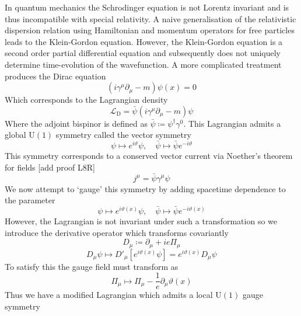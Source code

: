 \documentclass[11pt, a4paper]{article}
\theoremstyle{definition}
\theoremstyle{plain}
\begin{document}
In quantum mechanics the Schrodinger equation is not Lorentz invariant and is thus
incompatible with special relativity. A naive generalisation of the relativistic
dispersion relation using Hamiltonian and momentum operators
for free particles leads to the Klein-Gordon
equation. However, the Klein-Gordon equation is a second order partial differential equation and
subsequently does not uniquely determine time-evolution of the wavefunction.
A more complicated treatment produces the Dirac equation
\begin{equation}
  (i \gamma^\mu\partial_\mu - m)\psi(x) = 0
\end{equation}
Which corresponds to the Lagrangian density
\begin{equation}
  \mathcal{L}_\mathrm{D} = \bar{\psi}(i \gamma^\mu\partial_\mu - m)\psi
\end{equation}
Where the adjoint bispinor is defined as $\bar{\psi} \coloneq \psi^\dagger\gamma^0$.
This Lagrangian admits a global $\mathrm{U}(1)$ symmetry called the vector symmetry
\begin{equation}
  \psi \mapsto e^{i\vartheta}\psi, \quad \bar{\psi} \mapsto \bar{\psi}e^{-i\vartheta} 
\end{equation}
This symmetry corresponds to a conserved vector current via Noether's theorem for fields
[add proof L8R]
\begin{equation}
  j^\mu = \bar{\psi}\gamma^\mu\psi
\end{equation}
We now attempt to `gauge' this symmetry by adding spacetime dependence to the 
parameter
\begin{equation}
  \psi \mapsto e^{i\vartheta(x)}\psi, \quad \bar{\psi} \mapsto \bar{\psi}e^{-i\vartheta(x)}  
\end{equation}
However, the Lagrangian is not invariant under such a transformation so we introduce the
derivative operator which transforms covariantly
\begin{equation}
  D_\mu \coloneq \partial_\mu + ie\Pi_\mu
\end{equation}
\begin{equation}
  D_\mu \psi \mapsto D'_\mu\left[e^{i\vartheta(x)}\psi\right] = e^{i\vartheta(x)}D_\mu\psi
\end{equation}
To satisfy this the gauge field must transform as
\begin{equation}
  \Pi_\mu \mapsto \Pi_\mu -\frac{1}{e}\partial_\mu\vartheta(x)
\end{equation}
Thus we have a modified Lagrangian which admits a local $\mathrm{U}(1)$ gauge symmetry
\end{document}
